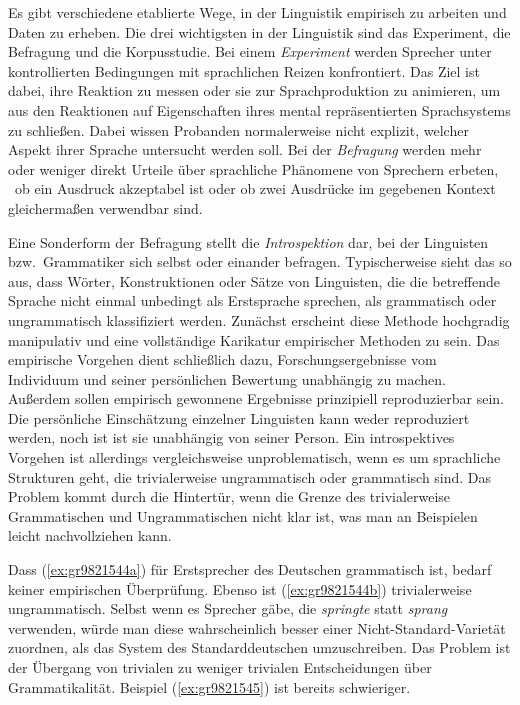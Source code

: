 Es gibt verschiedene etablierte Wege, in der Linguistik empirisch zu arbeiten und Daten zu erheben.
Die drei wichtigsten in der Linguistik sind das Experiment, die Befragung und die Korpusstudie.
Bei einem \textit{Experiment} werden Sprecher unter kontrollierten Bedingungen mit sprachlichen Reizen konfrontiert.
Das Ziel ist dabei, ihre Reaktion zu messen oder sie zur Sprachproduktion zu animieren, um aus den Reaktionen auf Eigenschaften ihres mental repräsentierten Sprachsystems zu schließen.
Dabei wissen Probanden normalerweise nicht explizit, welcher Aspekt ihrer Sprache untersucht werden soll.
Bei der \textit{Befragung} werden mehr oder weniger direkt Urteile über sprachliche Phänomene von Sprechern erbeten, \zB\ ob ein Ausdruck akzeptabel ist oder ob zwei Ausdrücke im gegebenen Kontext gleichermaßen verwendbar sind.

Eine Sonderform der Befragung stellt die \textit{Introspektion} dar, bei der Linguisten bzw.\ Grammatiker sich selbst oder einander befragen.
Typischerweise sieht das so aus, dass Wörter, Konstruktionen oder Sätze von Linguisten, die die betreffende Sprache nicht einmal unbedingt als Erstsprache sprechen, als grammatisch oder ungrammatisch klassifiziert werden.
Zunächst erscheint diese Methode hochgradig manipulativ und eine vollständige Karikatur empirischer Methoden zu sein.
Das empirische Vorgehen dient schließlich dazu, Forschungsergebnisse vom Individuum und seiner persönlichen Bewertung unabhängig zu machen.
Außerdem sollen empirisch gewonnene Ergebnisse prinzipiell reproduzierbar sein.
Die persönliche Einschätzung einzelner Linguisten kann weder reproduziert werden, noch ist ist sie unabhängig von seiner Person.
Ein introspektives Vorgehen ist allerdings vergleichsweise unproblematisch, wenn es um sprachliche Strukturen geht, die trivialerweise ungrammatisch oder grammatisch sind.
Das Problem kommt durch die Hintertür, wenn die Grenze des trivialerweise Grammatischen und Ungrammatischen nicht klar ist, was man an Beispielen leicht nachvollziehen kann.

\begin{exe}
	\ex\label{ex:gr9821544}
	\begin{xlist}
	\end{xlist}
\end{exe}

Dass (\ref{ex:gr9821544a}) für Erstsprecher des Deutschen grammatisch ist, bedarf keiner empirischen Überprüfung.
Ebenso ist (\ref{ex:gr9821544b}) trivialerweise ungrammatisch.
Selbst wenn es Sprecher gäbe, die \textit{springte} statt \textit{sprang} verwenden, würde man diese wahrscheinlich besser einer Nicht-Standard-Varietät zuordnen, als das System des Standarddeutschen umzuschreiben.
Das Problem ist der Übergang von trivialen zu weniger trivialen Entscheidungen über Grammatikalität.
Beispiel (\ref{ex:gr9821545}) ist bereits schwieriger.

